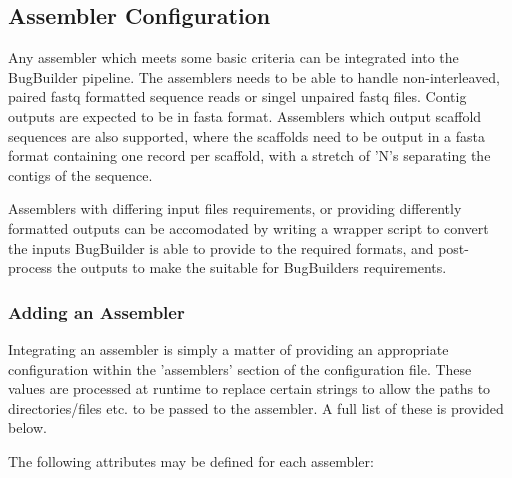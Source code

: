\documentclass[a4paper,10pt]{article}
\begin{document}
\subsection{Assembler Configuration}

Any assembler which meets some basic criteria can be integrated into the BugBuilder pipeline. The
assemblers needs to be able to handle non-interleaved, paired fastq formatted sequence reads or
singel unpaired fastq files. Contig outputs are expected to be in  fasta format. Assemblers which
output scaffold sequences are also supported, where the scaffolds need to be output in a fasta
format containing one record per scaffold, with a stretch of 'N's separating  the contigs of the
sequence. 

Assemblers with differing input files requirements, or providing differently formatted outputs can
be accomodated by writing a wrapper script to convert the inputs BugBuilder is able to provide to
the required formats, and post-process the outputs to make the suitable for BugBuilders
requirements.

\subsubsection{Adding an Assembler}

Integrating an assembler is simply a matter of providing an appropriate configuration within the
'assemblers' section of the configuration file. These values are processed at runtime to replace
certain strings to allow the paths to directories/files etc. to be passed to the assembler. A full
list of these is provided below. 

The following attributes may be defined for each assembler:
\end{document}
